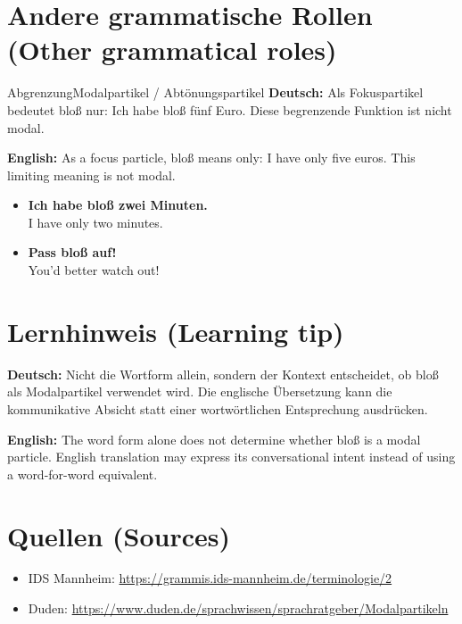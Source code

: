\documentclass[a4paper,11pt]{article}
\newcommand{\GermanText}[1]{\textbf{Deutsch: }#1\par}
\newcommand{\EnglishText}[1]{{\small\color{SoftGray}\textbf{English: }#1\par}}
\newcommand{\ExampleItem}[2]{\item \textbf{#1}\\{\small\color{SoftGray}#2}}
\begin{document}
\section{Andere grammatische Rollen \textnormal{(Other grammatical roles)}}
\begin{grammarentry}{Abgrenzung}{Modalpartikel / Abtönungspartikel}
\GermanText{Als Fokuspartikel bedeutet bloß nur: Ich habe bloß fünf Euro. Diese begrenzende Funktion ist nicht modal.}
\EnglishText{As a focus particle, bloß means only: I have only five euros. This limiting meaning is not modal.}
\end{grammarentry}
\begin{exbox}\begin{itemize}
\ExampleItem{Ich habe bloß zwei Minuten.}{I have only two minutes.}
\ExampleItem{Pass bloß auf!}{You'd better watch out!}
\end{itemize}\end{exbox}
\section{Lernhinweis \textnormal{(Learning tip)}}
\GermanText{Nicht die Wortform allein, sondern der Kontext entscheidet, ob bloß als Modalpartikel verwendet wird. Die englische Übersetzung kann die kommunikative Absicht statt einer wortwörtlichen Entsprechung ausdrücken.}
\EnglishText{The word form alone does not determine whether bloß is a modal particle. English translation may express its conversational intent instead of using a word-for-word equivalent.}
\section{Quellen \textnormal{(Sources)}}
\begin{itemize}
\item IDS Mannheim: \url{https://grammis.ids-mannheim.de/terminologie/2}
\item Duden: \url{https://www.duden.de/sprachwissen/sprachratgeber/Modalpartikeln}
\end{itemize}
\end{document}
